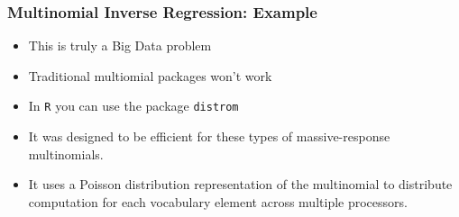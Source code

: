 \documentclass[
  shownotes,
  xcolor={svgnames},
  hyperref={colorlinks,citecolor=DarkBlue,linkcolor=DarkRed,urlcolor=DarkBlue}
  , aspectratio=169]{beamer}
\begin{document}
\begin{frame}
\frametitle{Multinomial Inverse Regression: Example}
\begin{itemize}
\item This is truly a Big Data problem
\medskip
\item Traditional multiomial packages won't work
\medskip
\item In \texttt{R} you can use the package \texttt{distrom} 
\medskip
\item It was designed to be efficient for these types of massive-response multinomials. 
\medskip
\item It uses a Poisson distribution representation of the multinomial to distribute computation for each vocabulary element across multiple processors.

\end{itemize}
\end{frame}
\end{document}
